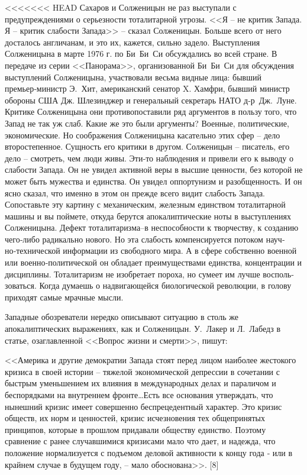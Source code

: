 \documentclass{book}
\begin{document}
{<<<<<<< HEAD
Сахаров и Солженицын не раз выступали с предупреждениями о серьезности тоталитарной угрозы. <<Я -- не критик Запада. Я -- критик слабости Запада>> -- сказал Солженицын. Больше всего от него досталось англичанам, и это их, кажется, сильно задело. Выступления Солженицына в марте 1976 г. по Би~Би~Си обсуждались во всей стране. В передаче из серии <<Панорама>>, организованной Би~Би~Си для обсуждения выступлений Солженицына, участвовали весьма видные лица: бывший премьер‑министр Э.~Хит, американский сенатор X. Хамфри, бывший министр обороны США Дж. Шлезинджер и генераль­ный секретарь НАТО д‑р~Дж.~Луне. Критике Солженицына они противопоставили ряд аргументов в пользу того, что Запад не так уж слаб. Какие же это были аргументы? Военные, политические, экономические. Но соображения Солженицына касательно этих сфер -- дело второстепенное. Сущность его кри­тики в другом. Солженицын -- писатель, его дело -- смотреть, чем люди живы. Эти‑то наблюдения и привели его к выводу о слабости Запада. Он не увидел активной веры в высшие цен­ности, без которой не может быть мужества и единства. Он уви­дел оппортунизм и разобщенность. И он ясно сказал, что имен­но в этом он прежде всего видит слабость Запада. Сопоставь­те эту картину с механическим, железным единством тотали­тарной машины и вы поймете, откуда берутся апокалиптические ноты в выступлениях Солженицына. Дефект тоталитариз­ма--в неспособности к творчеству, к созданию чего‑либо ради­кально нового. Но эта слабость компенсируется потоком науч­но‑технической информации из свободного мира. А в сфере собственно военной или военно‑политической он обладает преимуществами единства, концентрации и дисциплины. То­талитаризм не изобретает пороха, но сумеет им лучше восполь­зоваться. Когда думаешь о надвигающейся биологической ре­волюции, в голову приходят самые мрачные мысли.

Западные обозреватели нередко описывают ситуацию в столь же апокалиптических выражениях, как и Солженицын. У.~Лакер и Л.~Лабедз в статье, озаглавленной <<Вопрос жизни и смерти>>, пишут:

<<Америка и другие демократии Запада стоят перед лицом наиболее жестокого кризиса в своей истории -- тяжелой эконо­мической депрессии в сочетании с быстрым уменьшением их влияния в международных делах и параличом и беспорядками на внутреннем фронте\ldots Есть все основания утверждать, что нынешний кризис имеет совершенно беспрецедентный харак­тер. Это кризис обществ, их норм и ценностей, кризис исчез­новения тех общепринятых принципов, которые в прошлом придавали обществу единство. Поэтому сравнение с ранее слу­чавшимися кризисами мало что дает, и надежда, что положе­ние нормализуется с подъемом деловой активности к концу года ‑ или в крайнем случае в будущем году, -- мало обосно­вана>>. [8]

}
\end{document}
